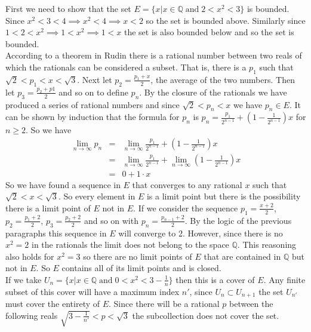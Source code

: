 \documentclass[11pt,reqno]{article}
\begin{document}
First we need to show that the set $E = \{ x | x \in \mathbb{Q} \; \text{and} \; 2 < x^2 < 3\}$ is bounded. Since $x^2 < 3 < 4 \implies x^2 < 4 \implies x < 2$ so the set is bounded above. Similarly since $1 < 2 < x^2 \implies 1 < x^2 \implies 1 < x$ the set is also bounded below and so the set is bounded. \\
\indent According to a theorem in Rudin there is a rational number between two reals of which the rationals can be considered a subset. That is, there is a $p_1$ such that $\sqrt{2} < p_1 < x < \sqrt{3}$. Next let $p_2 = \frac{p_1+ x}{2}$, the average of the two numbers. Then let $p_3 = \frac{p_2 + p1}{2}$ and so on to define $p_n$. By the closure of the rationals we have produced a series of rational numbers and since $\sqrt{2} < p_n < x$ we have $p_n \in E$. It can be shown by induction that the formula for $p_n$ is $p_n = \frac{p_1}{2^{n-1}} + (1 - \frac{1}{2^{n-1}})x$ for $n \ge 2$. So we have 
\begin{eqnarray*}
\lim_{n \to \infty} p_n &=& \lim_{n \to \infty} \frac{p_1}{2^{n-1}} + (1 - \frac{1}{2^{n-1}})x\\
		            &=& \lim_{n \to \infty} \frac{p_1}{2^{n-1}} + \lim_{n \to \infty} (1 - \frac{1}{2^{n-1}})x\\
                                    &=& 0 + 1\cdot x
\end{eqnarray*}
So we have found a sequence in $E$ that converges to any rational $x$ such that $\sqrt{2} < x < \sqrt{3}$. So every element in $E$ is a limit point but there is the possibility there is a limit point of $E$ not in $E$. If we consider the sequence $p_1= \frac{x + 2}{2}$, $p_2 = \frac{p_1 + 2}{2}$, $p_3 = \frac{p_2 + 2}{2}$ and so on with $p_n = \frac{p_{n-1} + 2}{2}$. By the logic of the previous paragraphs this sequence in $E$ will converge to 2. However, since there is no $x^2 = 2$ in the rationals the limit does not belong to the space $\mathbb{Q}$. This reasoning also holds for $x^2 = 3$ so there are no limit points of $E$ that are contained in $\mathbb{Q}$ but not in $E$. So $E$ contains all of its limit points and is closed.\\
\indent If we take $U_n = \{ x | x\in \mathbb{Q} \; \text{and} \; 0 < x^2 < 3 - \frac{1}{n} \}$ then this is a cover of $E$. Any finite subset of this cover will have a maximum index $n'$, since $U_n \subset U_{n+1}$ the set $U_{n'}$ must cover the entirety of $E$. Since there will be a rational $p$ between the following reals  $\sqrt{3 - \frac{1}{n'}} < p < \sqrt{3}$ the subcollection does not cover the set.
\end{document}
